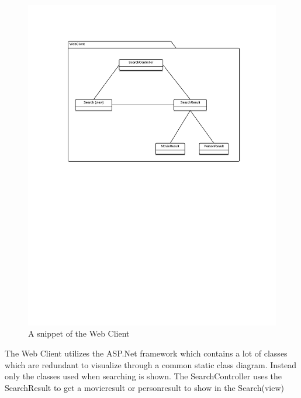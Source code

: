 \begin{figure}[H]
\includegraphics[scale=0.2]{img/SDD/WebClientSubsystemSnippet.png}
\caption{A snippet of the Web Client}
\label{fig:WebClientSubsystem}
\end{figure}

The Web Client utilizes the ASP.Net framework which contains a lot of classes which are redundant to visualize through a common static class diagram. Instead only the classes used when searching is shown. The SearchController uses the SearchResult to get a movieresult or personresult to show in the Search(view)\\

